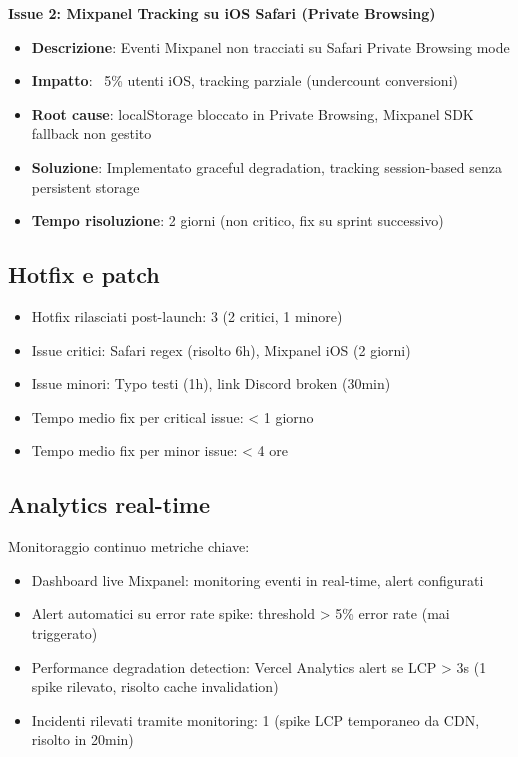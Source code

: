 \textbf{Issue 2: Mixpanel Tracking su iOS Safari (Private Browsing)}
\begin{itemize}
  \item \textbf{Descrizione}: Eventi Mixpanel non tracciati su Safari 
        Private Browsing mode
  \item \textbf{Impatto}: ~5\% utenti iOS, tracking parziale (undercount 
        conversioni)
  \item \textbf{Root cause}: localStorage bloccato in Private Browsing, 
        Mixpanel SDK fallback non gestito
  \item \textbf{Soluzione}: Implementato graceful degradation, tracking 
        session-based senza persistent storage
  \item \textbf{Tempo risoluzione}: 2 giorni (non critico, fix su sprint 
        successivo)
\end{itemize}

\subsection{Hotfix e patch}
\begin{itemize}
  \item Hotfix rilasciati post-launch: 3 (2 critici, 1 minore)
  \item Issue critici: Safari regex (risolto 6h), Mixpanel iOS (2 giorni)
  \item Issue minori: Typo testi (1h), link Discord broken (30min)
  \item Tempo medio fix per critical issue: < 1 giorno
  \item Tempo medio fix per minor issue: < 4 ore
\end{itemize}

\subsection{Analytics real-time}
Monitoraggio continuo metriche chiave:

\begin{itemize}
  \item Dashboard live Mixpanel: monitoring eventi in real-time, alert 
        configurati
  \item Alert automatici su error rate spike: threshold > 5\% error rate 
        (mai triggerato)
  \item Performance degradation detection: Vercel Analytics alert se 
        LCP > 3s (1 spike rilevato, risolto cache invalidation)
  \item Incidenti rilevati tramite monitoring: 1 (spike LCP temporaneo 
        da CDN, risolto in 20min)
\end{itemize}

